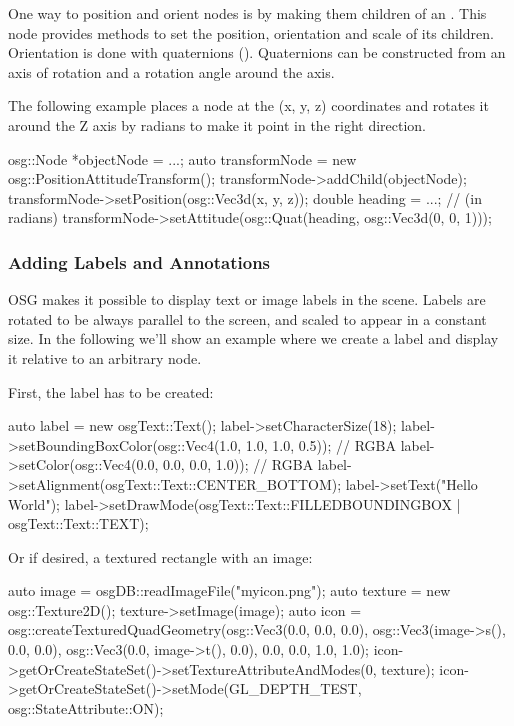 One way to position and orient nodes is by making them children of an
. This node provides methods to
set the position, orientation and scale of its children. Orientation is done
with quaternions (). Quaternions can be constructed from
an axis of rotation and a rotation angle around the axis.

The following example places a node at the (x, y, z) coordinates and rotates it
around the Z axis by  radians to make it point in the right
direction.

\begin{cpp}
osg::Node *objectNode = ...;
auto transformNode = new osg::PositionAttitudeTransform();
transformNode->addChild(objectNode);
transformNode->setPosition(osg::Vec3d(x, y, z));
double heading = ...; // (in radians)
transformNode->setAttitude(osg::Quat(heading, osg::Vec3d(0, 0, 1)));
\end{cpp}

\subsubsection{Adding Labels and Annotations}
\label{sec:graphics:osg-adding-labels-and-annotations}

OSG makes it possible to display text or image labels in the scene. Labels
are rotated to be always parallel to the screen, and scaled to appear in a
constant size. In the following we'll show an example where we create
a label and display it relative to an arbitrary node.

First, the label has to be created:

\begin{cpp}
auto label = new osgText::Text();
label->setCharacterSize(18);
label->setBoundingBoxColor(osg::Vec4(1.0, 1.0, 1.0, 0.5)); // RGBA
label->setColor(osg::Vec4(0.0, 0.0, 0.0, 1.0)); // RGBA
label->setAlignment(osgText::Text::CENTER_BOTTOM);
label->setText("Hello World");
label->setDrawMode(osgText::Text::FILLEDBOUNDINGBOX | osgText::Text::TEXT);
\end{cpp}

Or if desired, a textured rectangle with an image:

\begin{cpp}
auto image = osgDB::readImageFile("myicon.png");
auto texture = new osg::Texture2D();
texture->setImage(image);
auto icon = osg::createTexturedQuadGeometry(osg::Vec3(0.0, 0.0, 0.0),
    osg::Vec3(image->s(), 0.0, 0.0), osg::Vec3(0.0, image->t(), 0.0),
    0.0, 0.0, 1.0, 1.0);
icon->getOrCreateStateSet()->setTextureAttributeAndModes(0, texture);
icon->getOrCreateStateSet()->setMode(GL_DEPTH_TEST, osg::StateAttribute::ON);
\end{cpp}


